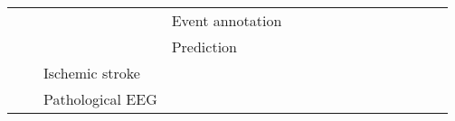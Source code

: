 \begin{tabular}{p{1.5cm}p{1.5cm}p{1.5cm}p{1.5cm}p{0.6cm}p{0.6cm}p{0.6cm}p{0.6cm}p{0.6cm}p{0.6cm}p{0.6cm}p{0.6cm}p{0.6cm}p{0.6cm}p{0.6cm}}
                                &                 &                   & Event annotation &                                                             &                                                                                                                             &                                                                        &                                      &                                                            &                      &                         &              \cite{Yang2016b} &                     &                         &                                                                      \\
                                &                 &                   & Prediction &                                                             &                                                                                                 \cite{Truong2018, Page2016} &                                                                        &                                      &                                                            &                      &                         &                               &  \cite{Truong2018a} &                         &                                                  \cite{Tsiouris2018} \\
                                &                 & Ischemic stroke &   &                                                             &                                                                                                            \cite{Giri2016a} &                                                                        &                                      &                                                            &                      &                         &                               &                     &                         &                                                                      \\
                                &                 & Pathological EEG &   &                                                             &                                                                                                   \cite{Schirrmeister2017a} &                                                         \cite{Roy2018} &                                      &                                                            &                      &                         &                               &                     &                         &                                                                      \\

\end{tabular}
